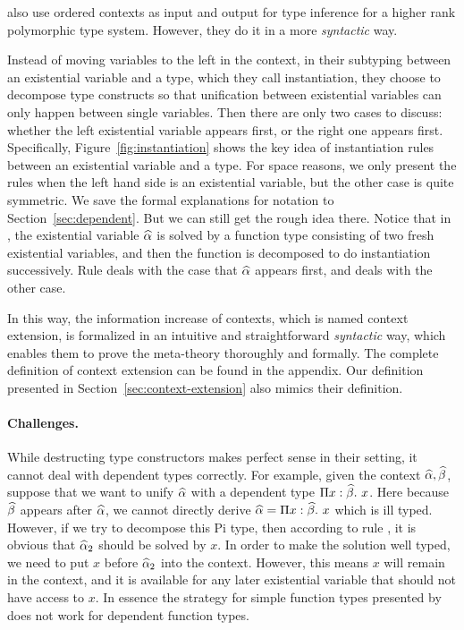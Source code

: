 \citet{dunfield2013complete} also use ordered contexts as input and output for
type inference for a higher rank polymorphic type system. However, they do it in
a more \textit{syntactic} way.

Instead of moving variables to the left in the context, in their subtyping
between an existential variable and a type, which they call instantiation, they
choose to decompose type constructs so that unification between existential
variables can only happen between single variables.
Then there are only two cases to discuss: whether the left
existential variable appears first, or the right one appears first.
Specifically, Figure~\ref{fig:instantiation} shows the key idea of instantiation
rules between an existential variable and a type. For space reasons, we only
present the rules when the left hand side is an existential variable, but the
other case is quite symmetric. We save the formal explanations for notation
to Section~\ref{sec:dependent}. But we can still get the rough idea
there. Notice that in , the existential variable $\widehat{\alpha}$ is solved by a
function type consisting of two fresh existential variables, and then the
function is decomposed to do instantiation successively. Rule 
deals with the case that $\widehat{\alpha}$ appears first, and  deals with the
other case.

In this way, the information increase of contexts, which is named context
extension, is formalized in an intuitive and straightforward \textit{syntactic}
way, which enables them to prove the meta-theory thoroughly and formally.
The complete definition of context extension can be found in the
appendix. Our
definition presented in Section~\ref{sec:context-extension} also mimics their
definition.

\paragraph{Challenges.} While destructing type constructors makes perfect sense
in their setting, it cannot deal with dependent types correctly. For example,
given the context $\widehat{\alpha}, \widehat{\beta}$, suppose that we want to unify $\widehat{\alpha}$ with a
dependent type $\Pi x:\widehat{\beta}.~ x$. Here because $\widehat{\beta}$ appears after $\widehat{\alpha}$, we
cannot directly derive $\widehat{\alpha} = \Pi x:\widehat{\beta}.~ x$ which is ill typed. However, if
we try to decompose this Pi type, then according to rule , it is
obvious that $\widehat{\alpha}_2$ should be solved by $x$. In order to make the solution
well typed, we need to put $x$ before $\widehat{\alpha}_2$ into the context. However, this
means $x$ will remain in the context, and it is available for any later
existential variable that should not have access to $x$. In essence the strategy
for simple function types presented by ~\citet{dunfield2013complete} does not
work for dependent function types.

